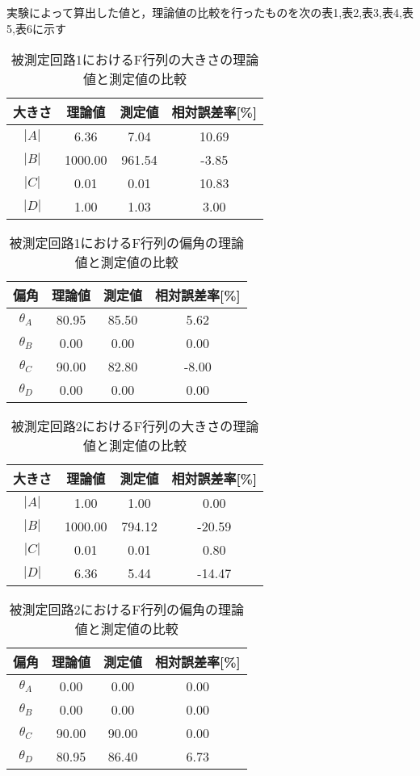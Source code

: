 実験によって算出した値と，理論値の比較を行ったものを次の表1,表2,表3,表4,表5,表6に示す

\begin{table}[!ht]
    \centering
    \caption{被測定回路1におけるF行列の大きさの理論値と測定値の比較}
    \begin{tabular}{c|ccc}
    \hline
        大きさ & 理論値 & 測定値 & 相対誤差率[\%] \\ \hline
        $|A|$ & 6.36 & 7.04 & 10.69 \\ 
        $|B|$ & 1000.00 & 961.54 & -3.85 \\ 
        $|C|$ & 0.01 & 0.01 & 10.83 \\ 
        $|D|$ & 1.00 & 1.03 & 3.00 \\ 
    \end{tabular}
\end{table}

\begin{table}[!ht]
    \centering
    \caption{被測定回路1におけるF行列の偏角の理論値と測定値の比較}
    \begin{tabular}{c|ccc}
    \hline
        偏角 & 理論値 & 測定値 & 相対誤差率[\%] \\ \hline
        $\theta_A$ & 80.95 & 85.50 & 5.62 \\ 
        $\theta_B$ & 0.00 & 0.00 & 0.00 \\ 
        $\theta_C$ & 90.00 & 82.80 & -8.00 \\
        $\theta_D$ & 0.00 & 0.00 & 0.00 \\
    \end{tabular}
\end{table}

\begin{table}[!ht]
    \centering
    \caption{被測定回路2におけるF行列の大きさの理論値と測定値の比較}
    \begin{tabular}{c|ccc}
    \hline
        大きさ & 理論値 & 測定値 & 相対誤差率[\%] \\ \hline
        $|A|$ & 1.00 & 1.00 & 0.00 \\ 
        $|B|$ & 1000.00 & 794.12 & -20.59 \\ 
        $|C|$ & 0.01 & 0.01 & 0.80 \\ 
        $|D|$ & 6.36 & 5.44 & -14.47 \\ 
    \end{tabular}
\end{table}

\begin{table}[!ht]
    \centering
    \caption{被測定回路2におけるF行列の偏角の理論値と測定値の比較}
    \begin{tabular}{c|ccc}
    \hline
        偏角 & 理論値 & 測定値 & 相対誤差率[\%] \\ \hline
        $\theta_A$ & 0.00 & 0.00 & 0.00 \\ 
        $\theta_B$ & 0.00 & 0.00 & 0.00 \\ 
        $\theta_C$ & 90.00 & 90.00 & 0.00 \\
        $\theta_D$ & 80.95 & 86.40 & 6.73 \\
    \end{tabular}
\end{table}

